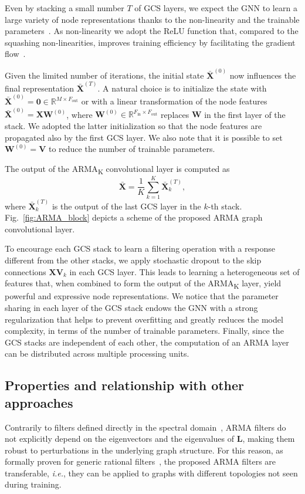 \documentclass{article}
\def\X{{\mathbf X}}
\def\W{{\mathbf W}}
\def\V{{\mathbf V}}
\def\L{{\mathbf L}}
\def\L{{\mathbf L}}
\begin{document}
Even by stacking a small number $T$ of GCS layers, we expect the GNN to learn a large variety of node representations thanks to the non-linearity and the trainable parameters~\cite{raghu2017expressive}.
As non-linearity we adopt the ReLU function that, compared to the squashing non-linearities, improves training efficiency by facilitating the gradient flow~\cite{goodfellow2016deep}.

Given the limited number of iterations, the initial state $\bar \X^{(0)}$ now influences the final representation $\bar \X^{(T)}$. 
A natural choice is to initialize the state with $\bar \X^{(0)} = \boldsymbol{0} \in \mathbb{R}^{M \times F_\text{out}}$ or with a linear transformation of the node features $\bar \X^{(0)} = \X \W^{(0)}$, where $\W^{(0)} \in \mathbb{R}^{F_\text{in} \times F_\text{out}}$ replaces $\W$ in the first layer of the stack.
We adopted the latter initialization so that the node features are propagated also by the first GCS layer.
We also note that it is possible to set $\W^{(0)} = \V$ to reduce the number of trainable parameters.

The output of the ARMA\textsubscript{K} convolutional layer is computed as
\begin{equation}
\label{eq:ARMA_layer}
    \bar{\X} = \frac{1}{K}\sum \limits_{k=1}^K \bar{\X}_k^{(T)},
\end{equation}
where $\bar{\X}_k^{(T)}$ is the output of the last GCS layer in the $k$-th stack.
Fig.~\ref{fig:ARMA_block} depicts a scheme of the proposed ARMA graph convolutional layer.

To encourage each GCS stack to learn a filtering operation with a response different from the other stacks, we apply stochastic dropout to the skip connections $\X\V_k$ in each GCS layer.
This leads to learning a heterogeneous set of features that, when combined to form the output of the ARMA\textsubscript{K} layer, yield powerful and expressive node representations.
We notice that the parameter sharing in each layer of the GCS stack endows the GNN with a strong regularization that helps to prevent overfitting and greatly reduces the model complexity, in terms of the number of trainable parameters.
Finally, since the GCS stacks are independent of each other, the computation of an ARMA layer can be distributed across multiple processing units.


\subsection{Properties and relationship with other approaches}
Contrarily to filters defined directly in the spectral domain~\cite{bruna2013spectral}, ARMA filters do not explicitly depend on the eigenvectors and the eigenvalues of $\L$, making them robust to perturbations in the underlying graph structure. 
For this reason, as formally proven for generic rational filters~\cite{transfer2019}, the proposed ARMA filters are transferable, \emph{i.e.}, they can be applied to graphs with different topologies not seen during training.
\end{document}
